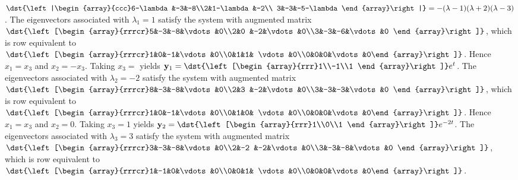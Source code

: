 \documentclass[dvips]{book}
\renewcommand{\exer}[1]{\par\medskip\;\noindent{\color{red}\bf #1.}}
\numberwithin{example}{section}
\numberwithin{equation}{section}
\numberwithin{theorem}{section}
\numberwithin{table}{section}
\numberwithin{figure}{section}
\begin{document}
\exer{10.4.22}
$\dst{\left|\begin{array}{ccc}6-\lambda&-3&-8\\2&1-\lambda&-2\\
3&-3&-5-\lambda\end{array}\right|}=-(\lambda-1)(\lambda+2)(\lambda-3)$.
The eigenvectors associated
 with $\lambda_1=1$ satisfy the system with  augmented matrix
$\dst{\left[\begin{array}{rrrcr}5&-3&-8&\vdots&0\\2&0
&-2&\vdots&0\\3&-3&-6&\vdots&0
\end{array}\right]}$,
which is row equivalent to
$\dst{\left[\begin{array}{rrrcr}1&0&-1&\vdots&0\\0&1&1&
\vdots&0\\0&0&0&\vdots&0\end{array}\right]}$.
Hence  $x_1=x_3$ and $x_2=-x_3$.  Taking $x_3=$ yields
${\bf y}_1=\dst{\left[\begin{array}{rrr}1\\-1\\1
\end{array}\right]}e^t$.
The eigenvectors associated
 with $\lambda_2=-2$ satisfy the system with  augmented matrix
$\dst{\left[\begin{array}{rrrcr}8&-3&-8&\vdots&0\\2&3
&-2&\vdots&0\\3&-3&-3&\vdots&0
\end{array}\right]}$,
which is row equivalent to
$\dst{\left[\begin{array}{rrrcr}1&0&-1&\vdots&0\\0&1&0&
\vdots&0\\0&0&0&\vdots&0\end{array}\right]}$.
Hence $x_1=x_3$ and $x_2=0$.  Taking $x_3=1$ yields
${\bf y}_2=\dst{\left[\begin{array}{rrr}1\\0\\1
\end{array}\right]}e^{-2t}$.
The eigenvectors associated
 with $\lambda_3=3$ satisfy the system with  augmented matrix
$\dst{\left[\begin{array}{rrrcr}3&-3&-8&\vdots&0\\2&-2
&-2&\vdots&0\\3&-3&-8&\vdots&0
\end{array}\right]}$,
which is row equivalent to
$\dst{\left[\begin{array}{rrrcr}1&-1&0&\vdots&0\\0&0&1&
\vdots&0\\0&0&0&\vdots&0\end{array}\right]}$.
\end{document}

